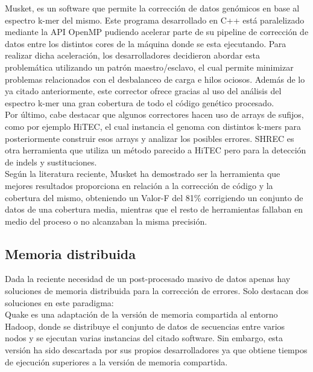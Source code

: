 \documentclass[conference]{IEEEtran}
\begin{document}
Musket\cite{musket}, es un software que permite la corrección de datos genómicos en base al espectro k-mer del mismo. Este programa desarrollado en C++ está paralelizado mediante la API OpenMP\cite{openmp} pudiendo acelerar parte de su pipeline de corrección de datos entre los distintos cores de la máquina donde se esta ejecutando. Para realizar dicha aceleración, los desarrolladores decidieron abordar esta problemática utilizando un patrón maestro/esclavo, el cual permite minimizar problemas relacionados con el desbalanceo de carga e hilos ociosos. Además de lo ya citado anteriormente, este corrector ofrece gracias al uso del análisis del espectro k-mer una gran cobertura de todo el código genético procesado.\\


Por último, cabe destacar que algunos correctores hacen uso de arrays de sufijos, como por ejemplo HiTEC\cite{hitec}, el cual instancia el genoma con distintos k-mers para posteriormente construir esos arrays y analizar los posibles errores. SHREC\cite{sherec} es otra herramienta que utiliza un método parecido a HiTEC pero para la detección de indels\cite{indels} y sustituciones.\\

Según la literatura reciente\cite{comparative}, Musket ha demostrado ser la herramienta que mejores resultados proporciona en relación a la corrección de código y la cobertura del mismo, obteniendo un Valor-F del 81\% corrigiendo un conjunto de datos de una cobertura media, mientras que el resto de herramientas fallaban en medio del proceso o no alcanzaban la misma precisión.

\subsection{Memoria distribuida}
Dada la reciente necesidad de un post-procesado masivo de datos apenas hay soluciones de memoria distribuida para la corrección de errores. Solo destacan dos soluciones en este paradigma:\\

Quake es una adaptación de la versión de memoria compartida al entorno Hadoop, donde se distribuye el conjunto de datos de secuencias entre varios nodos y se ejecutan varias instancias del citado software. Sin embargo, esta versión ha sido descartada por sus propios desarrolladores ya que obtiene tiempos de ejecución superiores a la versión de memoria compartida.\\
\end{document}
